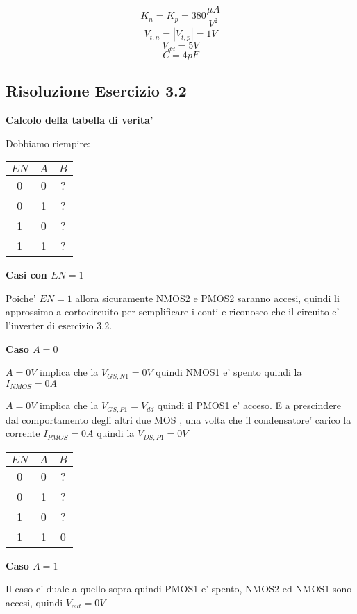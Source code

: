 \documentclass[\main/main.tex]{subfiles}
\begin{document}
\[K_n = K_p = 380\frac{\mu A}{V^2}\]
\[V_{t,n} = |V_{t,p}| = 1V\]
\[V_{dd} = 5V\]
\[C = 4pF\]

\clearpage
\subsection{Risoluzione Esercizio 3.2}
\textbf{Calcolo della tabella di verita'}

Dobbiamo riempire:
\begin{center}
    \begin{tabular}{ c  c | c}
        $EN$ & $A$ & $B$ \\
        \hline
        0    & 0   & ?   \\
        0    & 1   & ?   \\
        1    & 0   & ?   \\
        1    & 1   & ?   \\
    \end{tabular}
\end{center}

\textbf{Casi con $EN = 1$}

Poiche' $EN = 1$ allora sicuramente NMOS2 e PMOS2 saranno accesi, quindi li approssimo a cortocircuito per semplificare i conti e riconosco che il circuito e' l'inverter di esercizio 3.2.

\textbf{Caso $A = 0$}

$A = 0V$ implica che la $V_{GS,N1} = 0V$ quindi NMOS1 e' spento quindi la $I_{NMOS}  = 0A$

$A = 0V$ implica che la $V_{GS,P1} = V_{dd}$ quindi il PMOS1 e' acceso.
E a prescindere dal comportamento degli altri due MOS , una volta che il condensatore' carico la corrente $I_{PMOS} = 0A$ quindi la $V_{DS,P1} = 0V$
\begin{center}
    \begin{tabular}{ c  c | c}
        $EN$ & $A$ & $B$ \\
        \hline
        0    & 0   & ?   \\
        0    & 1   & ?   \\
        1    & 0   & ?   \\
        1    & 1   & 0   \\
    \end{tabular}
\end{center}

\textbf{Caso  $A = 1$}

Il caso e' duale a quello sopra quindi PMOS1 e' spento, NMOS2 ed NMOS1 sono accesi, quindi $V_{out} = 0V$
\end{document}
